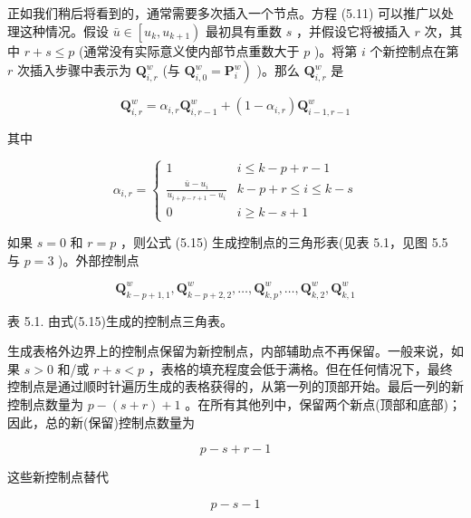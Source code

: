 \documentclass[../main.tex]{subfiles}
\begin{document}
正如我们稍后将看到的，通常需要多次插入一个节点。方程 (5.11) 可以推广以处理这种情况。假设 \(\bar{u} \in  \left\lbrack  {{u}_{k},{u}_{k + 1}}\right)\) 最初具有重数 \(s\) ，并假设它将被插入 \(r\) 次，其中 \(r + s \leq  p\) (通常没有实际意义使内部节点重数大于 \(p\) )。将第 \(i\) 个新控制点在第 \(r\) 次插入步骤中表示为 \({\mathbf{Q}}_{i,r}^{w}\) (与 \(\left. {{\mathbf{Q}}_{i,0}^{w} = {\mathbf{P}}_{i}^{w}}\right)\) )。那么 \({\mathbf{Q}}_{i,r}^{w}\) 是

\[
{\mathbf{Q}}_{i,r}^{w} = {\alpha }_{i,r}{\mathbf{Q}}_{i,r - 1}^{w} + \left( {1 - {\alpha }_{i,r}}\right) {\mathbf{Q}}_{i - 1,r - 1}^{w} \tag{5.15}
\]

其中

\[
{\alpha }_{i,r} = \left\{  \begin{matrix} 1 & i \leq  k - p + r - 1 \\  \frac{\bar{u} - {u}_{i}}{{u}_{i + p - r + 1} - {u}_{i}} & k - p + r \leq  i \leq  k - s \\  0 & i \geq  k - s + 1 \end{matrix}\right.
\]

如果 \(s = 0\) 和 \(r = p\) ，则公式 (5.15) 生成控制点的三角形表(见表 5.1，见图 5.5 与 \(p = 3\) )。外部控制点

\[
{\mathbf{Q}}_{k - p + 1,1}^{w},{\mathbf{Q}}_{k - p + 2,2}^{w},\ldots ,{\mathbf{Q}}_{k,p}^{w},\ldots ,{\mathbf{Q}}_{k,2}^{w},{\mathbf{Q}}_{k,1}^{w}
\]



\begin{center}
\begin{minipage}{14cm}
\vspace*{.6\baselineskip}
\centering
表 5.1. 由式(5.15)生成的控制点三角表。
\par\smallskip
{}
\end{minipage}
\end{center}

生成表格外边界上的控制点保留为新控制点，内部辅助点不再保留。一般来说，如果 \(s > 0\) 和/或 \(r + s < p\) ，表格的填充程度会低于满格。但在任何情况下，最终控制点是通过顺时针遍历生成的表格获得的，从第一列的顶部开始。最后一列的新控制点数量为 \(p - \left( {s + r}\right)  + 1\) 。在所有其他列中，保留两个新点(顶部和底部)；因此，总的新(保留)控制点数量为

\[
p - s + r - 1 \tag{5.16}
\]

这些新控制点替代

\[
p - s - 1 \tag{5.17}
\]
\end{document}

